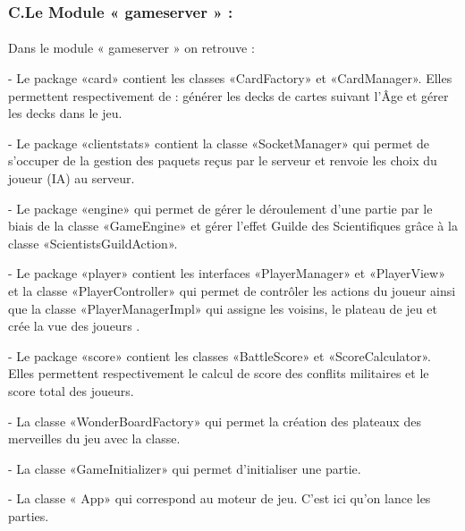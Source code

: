 \documentclass[13pt ,a4paper ]{report}
\begin{document}
\begin{multicols}{2}
\begin{flushleft}
\end{flushleft} 	  
		\subsubsection{C.\hspace*{0.5cm}Le Module « gameserver » :}
		\paragraph{}
 
Dans le module « gameserver » on retrouve :
\begin{flushleft}

-	Le package «card» contient les classes «CardFactory» et «CardManager». Elles permettent respectivement de : générer les decks de cartes suivant l’Âge et gérer les decks dans le jeu.
\newline

-	Le package «clientstats» contient la classe «SocketManager» qui permet de s’occuper de la gestion des paquets reçus par le serveur et renvoie les choix du joueur (IA) au serveur. 
\newline

-	Le package «engine» qui permet de gérer le déroulement d’une partie par le biais de la classe «GameEngine» et gérer l’effet Guilde des Scientifiques grâce à la classe «ScientistsGuildAction».
\newline

-	Le package «player» contient les interfaces «PlayerManager» et «PlayerView» et la classe «PlayerController» qui permet de contrôler les actions du joueur ainsi que la classe «PlayerManagerImpl» qui assigne les voisins, le plateau de jeu et crée la vue des joueurs . 
\newline

-	Le package «score» contient les classes «BattleScore» et «ScoreCalculator». Elles permettent respectivement le calcul de score des conflits militaires et le score total des joueurs.
\newline

-	La classe «WonderBoardFactory» qui permet la création des plateaux des merveilles du jeu avec la classe.
\newline

-	La classe «GameInitializer» qui permet d’initialiser une partie.
\newline

-	La classe « App» qui correspond au moteur de jeu. C’est ici qu’on lance les parties.


\end{flushleft}
\end{multicols}
\end{document}
